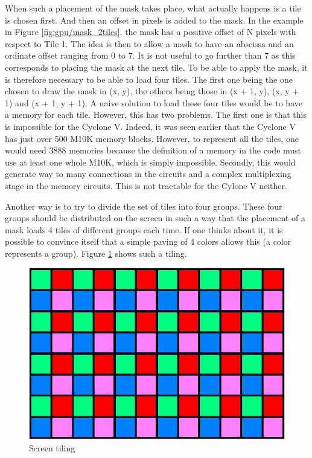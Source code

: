 When such a placement of the mask takes place, what actually happens is a tile is chosen first. And 
then an offset in pixels is added to the mask. In the example in Figure \ref{fig:gpu/mask_2tiles}, 
the mask has a positive 
offset of N pixels with respect to Tile 1. The idea is then to allow a mask to have an abscissa and
an ordinate offset ranging from 0 to 7. It is not useful to go further than 7 
as this corresponds to placing the mask at the next tile. To be able to apply the mask, it is 
therefore necessary to be able to load four tiles. The first one being the one chosen to draw the 
mask in (x, y), the others being those in (x + 1, y), (x, y + 1) and (x + 1, y + 1). A naive 
solution to load these four tiles would be to have a memory for each tile. However, this has two 
problems. The first one is that this is impossible for the Cyclone V. Indeed, it was seen earlier that 
the Cyclone V has just over 500 M10K memory blocks. However, to represent all the tiles, one would 
need 3888 memories because the definition of a memory in the code must use at least one whole M10K, 
which is simply impossible. Secondly, this would generate way to many connections in the circuits
and a complex multiplexing stage in the memory circuits. This is not tractable for the Cylone V 
neither.

Another way is to try to divide the set of tiles into four groups. These four groups should be 
distributed on the screen in such a way that the placement of a mask loads 4 tiles of different 
groups each time. If one thinks about it, it is possible to convince itself that a simple paving 
of 4 colors allows this (a color represents a group). Figure \ref{fig:gpu/screen_tiling} shows such 
a tiling. 

\begin{figure}[H]
    \centering
    \includegraphics[scale=1.0]{Chapter4-GPU_CLKU/res/screen_tiling}
    \caption{Screen tiling}
    \label{fig:gpu/screen_tiling}
\end{figure}

